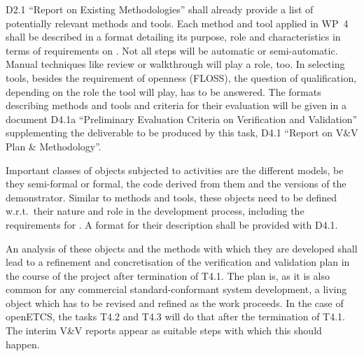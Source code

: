 D2.1 ``Report on Existing Methodologies'' shall already provide a list
of potentially relevant methods and tools. Each method and tool
applied in WP~4 shall be described in a format detailing its purpose,
role and characteristics in terms of requirements on \vv.  Not all
steps will be automatic or semi-automatic. Manual techniques
like review or walkthrough will play a role, too. In selecting tools,
besides the requirement of openness (FLOSS), the question of
qualification, depending on the role the tool will play, has to be
answered. The formats describing methods and tools and criteria for
their evaluation will be given in a document D4.1a ``Preliminary
Evaluation Criteria on Verification and Validation'' supplementing the
deliverable to be produced by this task, D4.1 ``Report on V\&V Plan \&
Methodology''. 

Important classes of objects subjected to \vv activities are the
different models, be they semi-formal or formal, the code derived from
them and the versions of the demonstrator. Similar to methods and
tools, these objects need to be defined w.r.t.\ their nature and role
in the development process, including the requirements for \vv. A
format for their description shall be provided with D4.1.

An analysis of these objects and the methods with which they are
developed shall lead to a refinement and concretisation of the
verification and validation plan in the course of the project after
termination of T4.1. The plan is, as it is also common for any commercial
standard-conformant system development, a living object which has to
be revised and refined as the work proceeds. In the case of openETCS,
the tasks T4.2 and T4.3 will do that after the termination of
T4.1. The interim V\&V reports appear as suitable steps with which
this should happen. 


